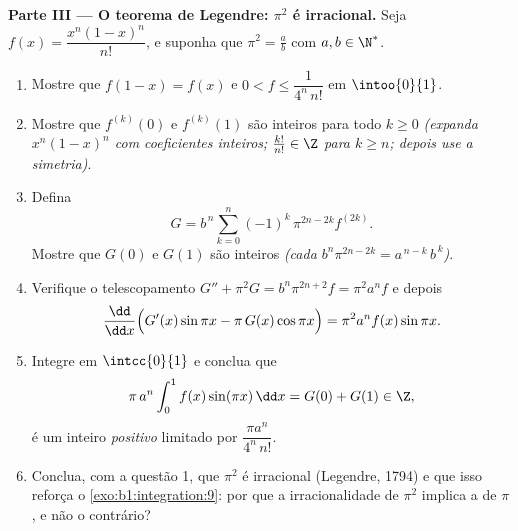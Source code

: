\begin{problem}
\medskip
\noindent\textbf{Parte III --- O teorema de Legendre: $\pi^2$ é
irracional.} Seja $f(x) = \dfrac{x^n (1 - x)^n}{n!}$, e suponha que
$\pi^2 = \frac ab$ com $a, b \in \N^*$.
\begin{enumerate}
  \item Mostre que $f(1 - x) = f(x)$ e $0 < f \leq
        \dfrac{1}{4^n\,n!}$ em $\intoo{0}{1}$.
  \item Mostre que $f^{(k)}(0)$ e $f^{(k)}(1)$ são inteiros para
        todo $k \geq 0$ \emph{(expanda $x^n(1-x)^n$ com coeficientes
        inteiros; $\frac{k!}{n!} \in \Z$ para $k \geq n$;
        depois use a simetria)}.
  \item Defina
        \[
        G = b^{\,n} \sum_{k=0}^{n} (-1)^k\,
        \pi^{2n - 2k} f^{(2k)} .
        \]
        Mostre que $G(0)$ e $G(1)$ são inteiros \emph{(cada
        $b^n \pi^{2n-2k} = a^{\,n-k}\,b^{\,k}$)}.
  \item Verifique o telescopamento $G'' + \pi^2 G = b^n \pi^{2n+2} f
        = \pi^2 a^n f$ e depois
        \[
        \frac{\dd}{\dd x}\Bigl(G'(x)\sin \pi x - \pi\,G(x)\cos
        \pi x\Bigr) = \pi^2 a^n f(x)\sin \pi x .
        \]
  \item Integre em $\intcc{0}{1}$ e conclua que
        \[
        \pi\,a^n \int_0^1 f(x)\sin(\pi x)\,\dd x = G(0) + G(1)
        \in \Z ,
        \]
        é um inteiro \emph{positivo} limitado por $\dfrac{\pi
        a^n}{4^n\,n!}$.
  \item Conclua, com a questão 1, que $\pi^2$ é irracional
        (Legendre, 1794) e que isso reforça o
        \cref{exo:b1:integration:9}: por que a irracionalidade
        de $\pi^2$ implica a de $\pi$, e não o contrário?
\end{enumerate}


\end{problem}
